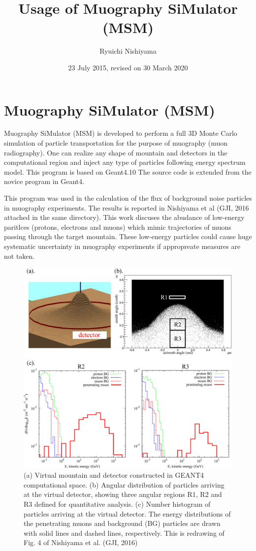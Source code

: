\documentclass[11pt,a4paper]{jsarticle}
\title{Usage of Muography SiMulator (MSM)}
\author{Ryuichi Nishiyama}
\date{23 July 2015, revised on 30 March 2020}
\begin{document}
\maketitle

\section{Muography SiMulator (MSM)}
Muography SiMulator (MSM) is developed to perform a full 3D Monte Carlo simulation of 
particle transportation for the purpose of muography (muon radiography). One can realize 
any shape of mountain and detectors in the computational region and inject any type of particles
following energy spectrum model. This program is based on Geant4.10 The source code is 
extended from the novice program in Geant4.

This program was used in the calculation of the flux of background noise particles in muography experiments. The results is reported in Nishiyama et al (GJI, 2016 attached in the same directory). This work discuses the abudance of low-energy paritlces (protons, electrons and muons)  which mimic trajectories of muons passing through the target mountain. These low-energy particles could cause huge systematic uncertainty in muography experiments if appropreate measures are not taken.

\begin{figure}
\includegraphics[width=120mm]{fig-geant4.eps}
\caption{(a) Virtual mountain and detector constructed in GEANT4 computational space. 
(b) Angular distribution of particles arriving at the virtual detector, showing three angular regions R1, R2 and R3 defined 
for quantitative analysis. (c) Number histogram of particles arriving at the virtual detector. The energy distributions of 
the penetrating muons and background (BG) particles are drawn with solid lines and dashed lines, respectively. This is redrawing of Fig. 4 of Nishiyama et al. (GJI, 2016) }
\label{fig:geant4}
\end{figure}
\end{document}
